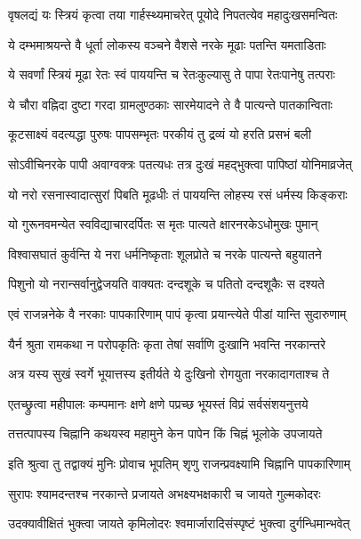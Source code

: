 \twolineshloka
{वृषलद्यं यः स्त्रियं कृत्वा तया गार्हस्थ्यमाचरेत्}
{पूयोदे निपतत्येव महादुःखसमन्वितः}%

\twolineshloka
{ये दम्भमाश्रयन्ते वै धूर्ता लोकस्य वञ्चने}
{वैशसे नरके मूढाः पतन्ति यमताडिताः}%

\twolineshloka
{ये सवर्णां स्त्रियं मूढा रेतः स्वं पाययन्ति च}
{रेतःकुल्यासु ते पापा रेतःपानेषु तत्पराः}%

\twolineshloka
{ये चौरा वह्निदा दुष्टा गरदा ग्रामलुण्ठकाः}
{सारमेयादने ते वै पात्यन्ते पातकान्विताः}%

\twolineshloka
{कूटसाक्ष्यं वदत्यद्धा पुरुषः पापसम्भृतः}
{परकीयं तु द्रव्यं यो हरति प्रसभं बली}%

\twolineshloka
{सोऽवीचिनरके पापी अवाग्वक्त्रः पतत्यधः}
{तत्र दुःखं महद्भुक्त्वा पापिष्ठां योनिमाव्रजेत्}%

\twolineshloka
{यो नरो रसनास्वादात्सुरां पिबति मूढधीः}
{तं पाययन्ति लोहस्य रसं धर्मस्य किङ्कराः}%

\twolineshloka
{यो गुरूनवमन्येत स्वविद्याचारदर्पितः}
{स मृतः पात्यते क्षारनरकेऽधोमुखः पुमान्}%

\twolineshloka
{विश्वासघातं कुर्वन्ति ये नरा धर्मनिष्कृताः}
{शूलप्रोते च नरके पात्यन्ते बहुयातने}%

\twolineshloka
{पिशुनो यो नरान्सर्वानुद्वेजयति वाक्यतः}
{दन्दशूके च पतितो दन्दशूकैः स दश्यते}%

\twolineshloka
{एवं राजन्ननेके वै नरकाः पापकारिणाम्}
{पापं कृत्वा प्रयान्त्येते पीडां यान्ति सुदारुणाम्}%

\twolineshloka
{यैर्न श्रुता रामकथा न परोपकृतिः कृता}
{तेषां सर्वाणि दुःखानि भवन्ति नरकान्तरे}%

\twolineshloka
{अत्र यस्य सुखं स्वर्गे भूयात्तस्य इतीर्यते}
{ये दुःखिनो रोगयुता नरकादागताश्च ते}%


\twolineshloka
{एतच्छ्रुत्वा महीपालः कम्पमानः क्षणे क्षणे}
{पप्रच्छ भूयस्तं विप्रं सर्वसंशयनुत्तये}%

\twolineshloka
{तत्तत्पापस्य चिह्नानि कथयस्व महामुने}
{केन पापेन किं चिह्नं भूलोके उपजायते}%

\twolineshloka
{इति श्रुत्वा तु तद्वाक्यं मुनिः प्रोवाच भूपतिम्}
{शृणु राजन्प्रवक्ष्यामि चिह्नानि पापकारिणाम्}%


\twolineshloka
{सुरापः श्यामदन्तश्च नरकान्ते प्रजायते}
{अभक्ष्यभक्षकारी च जायते गुल्मकोदरः}%

\twolineshloka
{उदक्यावीक्षितं भुक्त्वा जायते कृमिलोदरः}
{श्वमार्जारादिसंस्पृष्टं भुक्त्वा दुर्गन्धिमान्भवेत्}%

